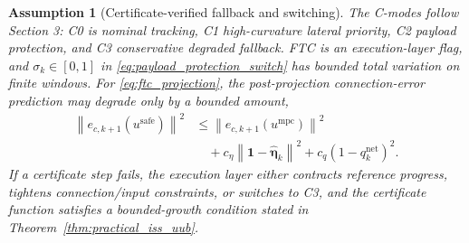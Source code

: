 \documentclass[letterpaper,journal]{IEEEtran}
\newcommand{\norm}[1]{\left\lVert #1 \right\rVert}
\newtheorem{assumption}{Assumption}
\begin{document}
\begin{assumption}[Certificate-verified fallback and switching]
The C-modes follow Section 3: C0 is nominal tracking, C1 high-curvature lateral priority, C2 payload protection, and C3 conservative degraded fallback. FTC is an execution-layer flag, and $\sigma_k\in[0,1]$ in \eqref{eq:payload_protection_switch} has bounded total variation on finite windows. For \eqref{eq:ftc_projection}, the post-projection connection-error prediction may degrade only by a bounded amount,
\begingroup\small
\begin{equation}
\begin{aligned}
\norm{e_{c,k+1}(u^{\mathrm{safe}})}^2
&\le \norm{e_{c,k+1}(u^{\mathrm{mpc}})}^2\\
&\quad +c_\eta\norm{\mathbf 1-\hat{\boldsymbol\eta}_k}^2
+c_q(1-q_k^{\mathrm{net}})^2 .
\end{aligned}
\label{eq:ftc_bounded_degradation}
\end{equation}
\endgroup
If a certificate step fails, the execution layer either contracts reference progress, tightens connection/input constraints, or switches to C3, and the certificate function satisfies a bounded-growth condition stated in Theorem~\ref{thm:practical_iss_uub}.
\end{assumption}
\end{document}
